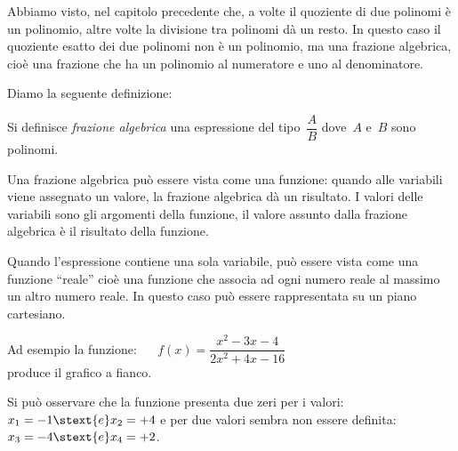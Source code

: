 Abbiamo visto, nel capitolo precedente che, a volte il quoziente di due 
polinomi è un polinomio, altre volte la divisione tra polinomi dà un resto.
In questo caso il quoziente esatto dei due polinomi non è un polinomio, ma 
una frazione algebrica, cioè una frazione che ha un polinomio al numeratore e 
uno al denominatore.

% 

Diamo la seguente definizione:
\begin{definizione}
Si definisce \emph{frazione algebrica} una espressione del 
tipo~\(\dfrac{A}{B}\) dove~\(A\) e~\(B\) sono polinomi.
\end{definizione}

Una frazione algebrica può essere vista come una funzione: quando alle 
variabili viene assegnato un valore, la frazione algebrica dà un risultato.
I valori delle variabili sono gli argomenti della funzione, il valore assunto 
dalla frazione algebrica è il risultato della funzione.

{
Quando l'espressione contiene una sola variabile, può essere vista come una 
funzione ``reale'' cioè una funzione che associa ad ogni numero reale al 
massimo un altro numero reale.
In questo caso può essere rappresentata su un piano cartesiano.

Ad esempio la funzione: ~~ \(f(x) = \dfrac{x^2 -3x -4}{2x^2 +4x -16}\)\\
produce il grafico a fianco.

Si può osservare che la funzione presenta due zeri per i valori: 
\(x_1=-1 \stext{e} x_2=+4\) e per due valori sembra non essere definita:
\(x_3=-4 \stext{e} x_4=+2\).
}
{\hspace{5mm} \graficofrazionea}

